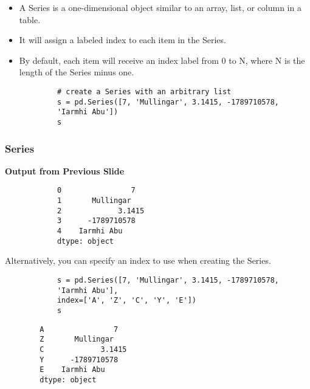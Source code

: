 \documentclass[KSmainSlides.tex]{subfiles}
\begin{document}
	\begin{frame}[fragile]
		\begin{itemize}
			\item A Series is a one-dimensional object similar to an array, list, or column in a table. 
			\item It will assign a labeled index to each item in the Series. \item By default, each item will receive an index label from 0 to N, where N is the length of the Series minus one.
		\end{itemize}
		
		
		\begin{framed}
			\begin{verbatim}
			# create a Series with an arbitrary list
			s = pd.Series([7, 'Mullingar', 3.1415, -1789710578,
			'Iarmhi Abu'])
			s
			\end{verbatim}
		\end{framed}
		
	\end{frame}
	\begin{frame}[fragile]
		\frametitle{Series}
		\textbf{Output from Previous Slide}
		\begin{framed}		
			\begin{verbatim}
			0                7
			1       Mullingar
			2             3.1415
			3      -1789710578
			4    Iarmhi Abu
			dtype: object
			\end{verbatim}
		\end{framed}
	\end{frame}
	\begin{frame}[fragile]
		
		Alternatively, you can specify an index to use when creating the Series.
		
		\begin{framed}
			\begin{verbatim}
			s = pd.Series([7, 'Mullingar', 3.1415, -1789710578, 
			'Iarmhi Abu'],
			index=['A', 'Z', 'C', 'Y', 'E'])
			s
			\end{verbatim}
		\end{framed}
		\begin{verbatim}
		A                7
		Z       Mullingar
		C             3.1415
		Y      -1789710578
		E    Iarmhi Abu
		dtype: object
		\end{verbatim}
	\end{frame}
\end{document}
